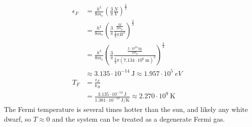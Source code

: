 \documentclass{article}
\begin{document}
\begin{equation}
    \begin{split}
        \epsilon_F & = \frac{h^2}{8m_e}{\left(\frac{3}{\pi}\frac{N}{V}\right)}^{\frac{2}{3}} \\
        & = \frac{h^2}{8m_e}{\left(\frac{3}{\pi}\frac{\frac{M}{2m_p}}{\frac{4}{3}\pi R^3}\right)}^{\frac{2}{3}} \\
        & = \frac{h^2}{8m_e}{\left(\frac{3}{\pi}\frac{\frac{2 \cdot 10^{30}~\unit{\kilo\gram}}{2m_p}}{\frac{4}{3}\pi {\left(7.134 \cdot 10^6~\unit{\meter}\right)}^3}\right)}^{\frac{2}{3}} \\
        & \approx 3.135 \cdot 10^{-14}~\unit{\joule} \approx 1.957 \cdot 10^5 ~\unit{eV} \\
        T_F & = \frac{\epsilon_F}{k_B} \\
        & = \frac{3.135 \cdot 10^{-14}~\unit{\joule}}{1.381 \cdot 10^{-23}~\unit{\joule\per\kelvin}} \approx 2.270 \cdot 10^9~\unit{\kelvin}
    \end{split}
\end{equation}
The Fermi temperature is several times hotter than the sun, and likely any white dwarf, so $T \approx 0$ and the system can be treated as a degenerate Fermi gas.
\end{document}
